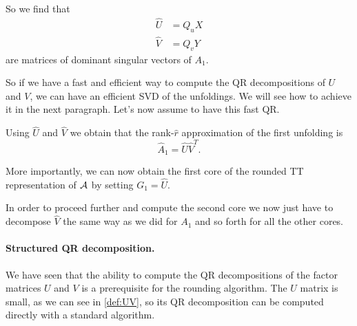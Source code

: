 So we find that
\begin{equation*}
  \begin{split}
    \hat{U} &= Q_u X\\
    \hat{V} &= Q_v Y
  \end{split}
\end{equation*}
are matrices of dominant singular vectors of $A_1$.

So if we have a fast and efficient way to compute the QR decompositions of $U$ and $V$, we can have an efficient SVD of the unfoldings. We will see how to achieve it in the next paragraph.
Let's now assume to have this fast QR.

Using $\hat{U}$ and $\hat{V}$ we obtain that the rank-$\hat{r}$ approximation of the first unfolding is
\begin{equation*}
  \hat{A}_1 = \hat{U} \hat{V}^T.
\end{equation*}

More importantly, we can now obtain the first core of the rounded TT representation of $\mathcal{A}$ by setting $G_1 = \hat{U}$.

In order to proceed further and compute the second core we now just have to decompose $\hat{V}$ the same way as we did for $A_1$ and so forth for all the other cores.

\paragraph{Structured QR decomposition.}
We have seen that the ability to compute the QR decompositions of the factor matrices $U$ and $V$ is a prerequisite for the rounding algorithm.
The $U$ matrix is small, as we can see in \eqref{def:UV}, so its QR decomposition can be computed directly with a standard algorithm.

